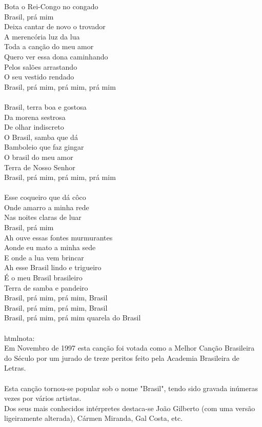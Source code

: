 \documentclass{article}
\begin{document}
Bota o Rei-Congo no congado \\
Brasil, prá mim \\
Deixa cantar de novo o trovador \\
A merencória luz da lua \\
Toda a canção do meu amor \\
Quero ver essa dona caminhando \\
Pelos salões arrastando \\
O seu vestido rendado \\
Brasil, prá mim, prá mim, prá mim \\
\\
Brasil, terra boa e gostosa \\
Da morena sestrosa \\
De olhar indiscreto \\
O Brasil, samba que dá \\
Bamboleio que faz gingar \\
O brasil do meu amor \\
Terra de Nosso Senhor \\
Brasil, prá mim, prá mim, prá mim \\
\\
Esse coqueiro que dá côco \\
Onde amarro a minha rede \\
Nas noites claras de luar \\
Brasil, prá mim \\
Ah ouve essas fontes murmurantes \\
Aonde eu mato a minha sede \\
E onde a lua vem brincar \\
Ah esse Brasil lindo e trigueiro \\
É o meu Brasil brasileiro \\
Terra de samba e pandeiro \\
Brasil, prá mim, prá mim, Brasil \\
Brasil, prá mim, prá mim, Brasil \\
Brasil, prá mim, prá mim quarela do Brasil \\
\\
htmlnota: \\
Em Novembro de 1997 esta canção foi votada como a Melhor Canção Brasileira \\
do Século por um jurado de treze peritos feito pela Academia Brasileira de \\
Letras. \\
\\
Esta canção tornou-se popular sob o nome "Brasil", tendo sido gravada inúmeras\\
vezes por vários artistas. \\
Dos seus mais conhecidos intérpretes destaca-se João Gilberto (com uma versão\\
ligeiramente alterada), Cármen Miranda, Gal Costa, etc. \\
\end{document}

